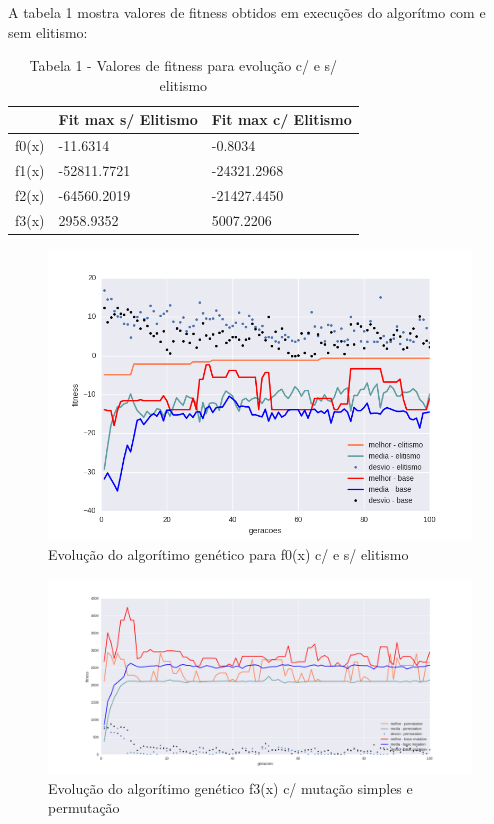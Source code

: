 \documentclass[conference]{IEEEtran}
\begin{document}
A tabela 1 mostra valores de fitness obtidos em execuções do algorítmo
com e sem elitismo:\\


\begin{table}[h]
\begin{tabular}{|l|l|l|}
\hline
      & Fit max s/ Elitismo & Fit max c/ Elitismo \\ \hline
f0(x) & -11.6314            & -0.8034             \\ \hline
f1(x) & -52811.7721         & -24321.2968         \\ \hline
f2(x) & -64560.2019         & -21427.4450         \\ \hline
f3(x) & 2958.9352           & 5007.2206           \\ \hline
\end{tabular}
\caption*{Tabela 1 - Valores de fitness para evolução c/ e s/ elitismo}
\end{table}


\begin{figure}[!t]
\centering
\includegraphics[scale=0.7]{f0_elitism}
\caption{Evolução do algorítimo genético para f0(x) c/ e s/ elitismo}
\end{figure}

\begin{figure}[!t]
\centering
\includegraphics[scale=0.7]{f3_permutation}
\caption{Evolução do algorítimo genético f3(x) c/ mutação simples e permutação}
\end{figure}
\end{document}
